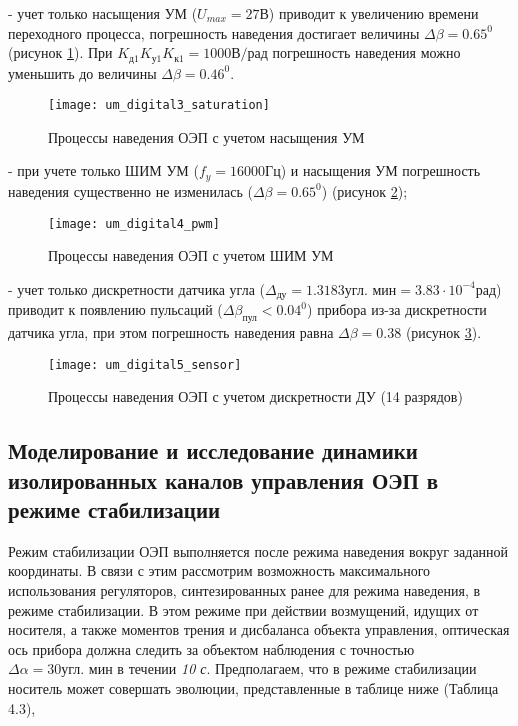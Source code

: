 - учет только насыщения УМ ($U_{max} = 27 \textit{В}$) приводит к увеличению времени переходного процесса, погрешность наведения достигает величины $\varDelta \beta = 0.65^0$ (рисунок \ref{fig:um_digital3}). При $K_{\textit{д1}} K_{\textit{у1}} K_{\textit{к1}} = 1000 \textit{В/рад}$ погрешность наведения можно уменьшить до величины  $\varDelta \beta = 0.46^0$. \par


\begin{figure}[ht]
	\centering
	\texttt{[image: um\_digital3\_saturation]} 
	\caption{Процессы наведения ОЭП с учетом насыщения УМ}
	\label{fig:um_digital3}
\end{figure}

- при учете только ШИМ УМ ($f_y = 16000 \textit{Гц}$) и насыщения УМ погрешность наведения существенно не изменилась ($\varDelta \beta = 0.65^0$) (рисунок \ref{fig:um_digital4});\par

\begin{figure}[ht]
	\centering
	\texttt{[image: um\_digital4\_pwm]} 
	\caption{Процессы наведения ОЭП с учетом ШИМ УМ}
	\label{fig:um_digital4}
\end{figure}


- учет только дискретности датчика угла ($\varDelta_{\textit{ду}} = 1.3183 \textit{угл. мин} = 3.83 \cdot 10^{-4} \textit{рад}$) приводит к появлению пульсаций ($\varDelta \beta_{\textit{пул}} < 0.04^0$) прибора из-за дискретности датчика угла, при этом погрешность наведения равна $\varDelta \beta = 0.38$ (рисунок \ref{fig:um_digital5}).\par

\begin{figure}[ht]
	\centering
	\texttt{[image: um\_digital5\_sensor]} 
	\caption{Процессы наведения ОЭП с учетом дискретности ДУ (14 разрядов)}
	\label{fig:um_digital5}
\end{figure}

\subsection{Моделирование и исследование динамики изолированных каналов управления ОЭП в режиме стабилизации} \label{ch:ch4/sect6}

Режим стабилизации ОЭП выполняется после режима наведения вокруг заданной координаты. В связи с этим рассмотрим возможность максимального использования регуляторов, синтезированных ранее для режима наведения, в режиме стабилизации. В этом режиме при действии возмущений, идущих от носителя, а также моментов трения и дисбаланса  объекта управления, оптическая ось прибора должна следить за объектом наблюдения с точностью $\varDelta \alpha = 30 \textit{угл. мин}$ в течении \textit{10 с}. Предполагаем, что в режиме стабилизации носитель может совершать эволюции, представленные в таблице ниже (Таблица 4.3), 

